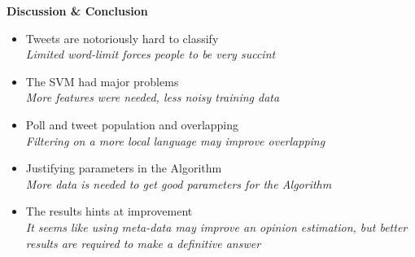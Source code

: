 \documentclass[landscape,20pt]{extarticle}
\newcommand*{\TitleFont}{\Huge \bf}
\newcommand*{\TextFont}{\normalsize \it}
\begin{document}
{\TitleFont Discussion \& Conclusion}
\Large
\begin{itemize}
\item Tweets are notoriously hard to classify\\
{\TextFont Limited word-limit forces people to be very succint}
\item The SVM had major problems\\
{\TextFont More features were needed, less noisy training data}
\item Poll and tweet population and overlapping\\
{\TextFont Filtering on a more local language may improve overlapping}
\item Justifying parameters in the Algorithm\\
{\TextFont More data is needed to get good parameters for the Algorithm}
\item The results hints at improvement\\
{\TextFont It seems like using meta-data may improve an opinion estimation, but better results are required to make a definitive answer}
\end{itemize}
\end{document}
